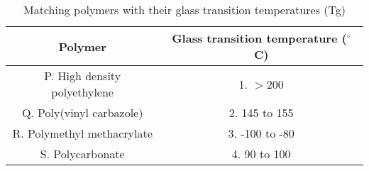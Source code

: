 \begin{table}[htbp]
\centering
\caption{Matching polymers with their glass transition temperatures (Tg)}
\label{tab:tables/table3.tex}
\begin{tabular}{c|c}
\textbf{Polymer} & \textbf{Glass transition temperature ($^{\circ}$C)} \\ \hline
P. High density polyethylene & 1. $>$200 \\
Q. Poly(vinyl carbazole) & 2. 145 to 155 \\
R. Polymethyl methacrylate & 3. -100 to -80 \\
S. Polycarbonate & 4. 90 to 100 \\
\end{tabular}
\end{table}